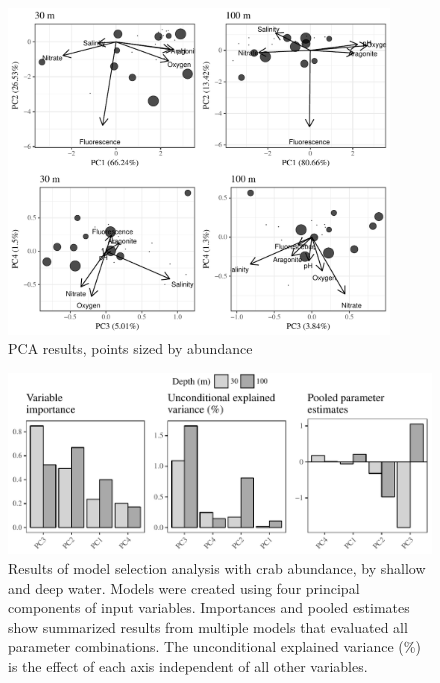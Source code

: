 \documentclass[letterpaper,12pt]{article}\usepackage[]{graphicx}\usepackage[]{color}
\makeatletter
\def\maxwidth{ %
  \ifdim\Gin@nat@width>\linewidth
    \linewidth
  \else
    \Gin@nat@width
  \fi
}
\newenvironment{knitrout}{}{} %
\makeatother
\begin{document}
\begin{knitrout}
\color{fgcolor}\begin{figure}[!h]
\includegraphics[width=0.9\textwidth]{figure/unnamed-chunk-8-1} \caption[PCA results, points sized by abundance]{PCA results, points sized by abundance}\label{fig:unnamed-chunk-8}
\end{figure}


\end{knitrout}



\begin{knitrout}
\color{fgcolor}\begin{figure}
\includegraphics[width=\maxwidth]{figure/unnamed-chunk-10-1} \caption[Results of model selection analysis with crab abundance, by shallow and deep water]{Results of model selection analysis with crab abundance, by shallow and deep water. Models were created using four principal components of input variables. Importances and pooled estimates show summarized results from multiple models that evaluated all parameter combinations.  The unconditional explained variance (\%) is the effect of each axis independent of all other variables.}\label{fig:unnamed-chunk-10}
\end{figure}


\end{knitrout}
\end{document}
